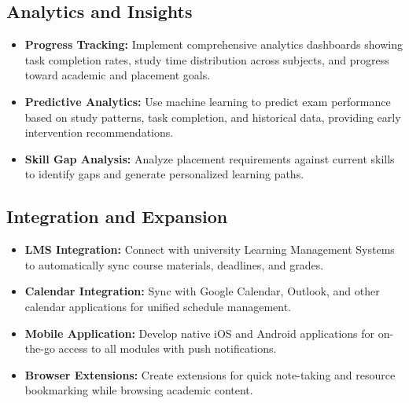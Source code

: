 \documentclass[12pt]{article}
\begin{document}
\subsection{Analytics and Insights}
\begin{itemize}
    \item \textbf{Progress Tracking:} Implement comprehensive analytics dashboards showing task completion rates, study time distribution across subjects, and progress toward academic and placement goals.
    
    \item \textbf{Predictive Analytics:} Use machine learning to predict exam performance based on study patterns, task completion, and historical data, providing early intervention recommendations.
    
    \item \textbf{Skill Gap Analysis:} Analyze placement requirements against current skills to identify gaps and generate personalized learning paths.
\end{itemize}

\subsection{Integration and Expansion}
\begin{itemize}
    \item \textbf{LMS Integration:} Connect with university Learning Management Systems to automatically sync course materials, deadlines, and grades.
    
    \item \textbf{Calendar Integration:} Sync with Google Calendar, Outlook, and other calendar applications for unified schedule management.
    
    \item \textbf{Mobile Application:} Develop native iOS and Android applications for on-the-go access to all modules with push notifications.
    
    \item \textbf{Browser Extensions:} Create extensions for quick note-taking and resource bookmarking while browsing academic content.
\end{itemize}
\end{document}
